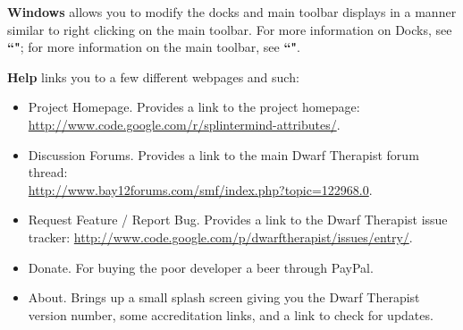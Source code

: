 \documentclass[]{article}
\begin{document}
\noindent \textbf{Windows} allows you to modify the docks and main toolbar displays in a
manner similar to right clicking on the main toolbar. For more information on Docks, see
\textbf{``"}; for more information on the main toolbar, see
\textbf{``"}.
\vspace{12pt}

\noindent \textbf{Help} links you to a few different webpages and such:
\begin{itemize}

\item Project Homepage. Provides a link to the project
homepage:\\\url{http://www.code.google.com/r/splintermind-attributes/}.

\item Discussion Forums. Provides a link to the main Dwarf Therapist forum thread:\\
\url{http://www.bay12forums.com/smf/index.php?topic=122968.0}.

\item Request Feature / Report Bug. Provides a link to the Dwarf Therapist issue tracker:
\url{http://www.code.google.com/p/dwarftherapist/issues/entry/}.

\item Donate. For buying the poor developer a beer through PayPal.

\item About. Brings up a small splash screen giving you the Dwarf Therapist version number, some
accreditation links, and a link to check for updates.
\end{itemize}

\newpage
\end{document}

